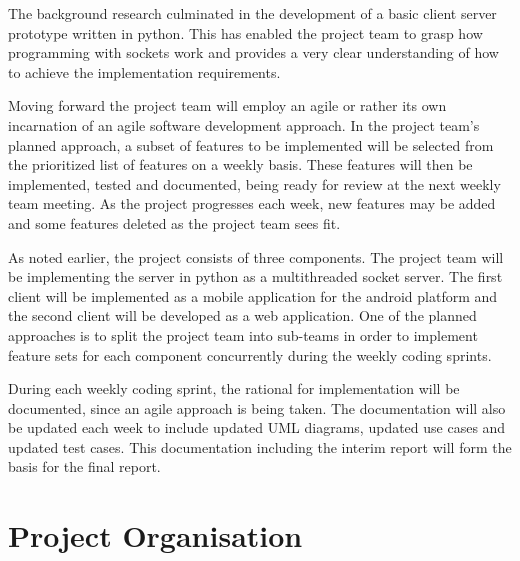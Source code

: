 \documentclass[11pt,a4paper]{article}
\begin{document}
The background research culminated in the development of a basic client server prototype written in python. This has enabled the project team to grasp how programming with sockets work and provides a very clear understanding of how to achieve the implementation requirements.

Moving forward the project team will employ an agile or rather its own incarnation of an agile software development approach. In the project team's planned approach, a subset of features to be implemented will be selected from the prioritized list of features on a weekly basis. These features will then be implemented, tested and documented, being ready for review at the next weekly team meeting. As the project progresses each week, new features may be added and some features deleted as the project team sees fit.

As noted earlier, the project consists of three components. The project team will be implementing the server in python as a multithreaded socket server. The first client will be implemented as a mobile application for the android platform and the second client will be developed as a web application. One of the planned approaches is to split the project team into sub-teams in order to implement feature sets for each component concurrently during the weekly coding sprints. 

During each weekly coding sprint, the rational for implementation will be documented, since an agile approach is being taken. The documentation will also be updated each week to include updated UML diagrams, updated use cases and updated test cases. This documentation including the interim report will form the basis for the final report.


\section{Project Organisation}
\end{document}
